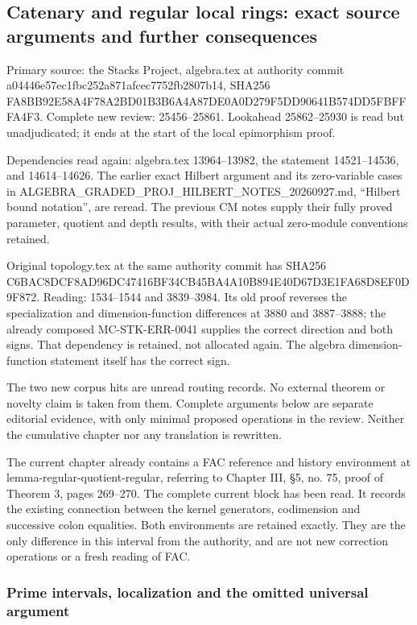 \subsection{Catenary and regular local rings: exact source arguments and further consequences}\label{catenary-and-regular-local-rings-exact-source-arguments-and-further-consequences}

Primary source: the Stacks Project, algebra.tex at authority commit a04446e57ec1fbc252a871afcec7752fb2807b14, SHA256 FA8BB92E58A4F78A2BD01B3B6A4A87DE0A0D279F5DD90641B574DD5FBFFFA4F3. Complete new review: 25456--25861. Lookahead 25862--25930 is read but unadjudicated; it ends at the start of the local epimorphism proof.

Dependencies read again: algebra.tex 13964--13982, the statement 14521--14536, and 14614--14626. The earlier exact Hilbert argument and its zero-variable cases in ALGEBRA\_GRADED\_PROJ\_HILBERT\_NOTES\_20260927.md, ``Hilbert bound notation'', are reread. The previous CM notes supply their fully proved parameter, quotient and depth results, with their actual zero-module conventions retained.

Original topology.tex at the same authority commit has SHA256 C6BAC8DCF8AD96DC47416BF34CB45BA4A10B894E40D67D3E1FA68D8EF0D9F872. Reading: 1534--1544 and 3839--3984. Its old proof reverses the specialization and dimension-function differences at 3880 and 3887--3888; the already composed MC-STK-ERR-0041 supplies the correct direction and both signs. That dependency is retained, not allocated again. The algebra dimension-function statement itself has the correct sign.

The two new corpus hits are unread routing records. No external theorem or novelty claim is taken from them. Complete arguments below are separate editorial evidence, with only minimal proposed operations in the review. Neither the cumulative chapter nor any translation is rewritten.

The current chapter already contains a FAC reference and history environment at lemma-regular-quotient-regular, referring to Chapter III, §5, no. 75, proof of Theorem 3, pages 269--270. The complete current block has been read. It records the existing connection between the kernel generators, codimension and successive colon equalities. Both environments are retained exactly. They are the only difference in this interval from the authority, and are not new correction operations or a fresh reading of FAC.

\subsubsection{Prime intervals, localization and the omitted universal argument}\label{prime-intervals-localization-and-the-omitted-universal-argument}

